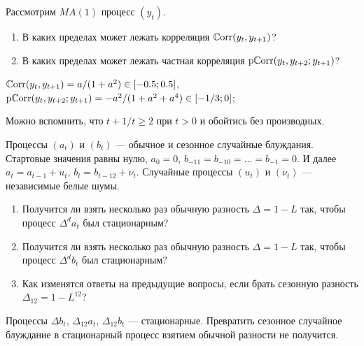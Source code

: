 \begin{problem}
  Рассмотрим $MA(1)$ процесс $(y_t)$. 
  \begin{enumerate}
    \item В каких пределах может лежать корреляция $\operatorname{\mathbb{C}\mathrm{orr}}(y_t, y_{t+1})$?
    \item В каких пределах может лежать частная корреляция $\operatorname{\mathrm{p}\mathbb{C}\mathrm{orr}}(y_t, y_{t+2} ; y_{t+1})$?
  \end{enumerate}
  
  \begin{sol}
    $\operatorname{\mathbb{C}\mathrm{orr}}(y_t, y_{t+1})  = a/(1+a^2) \in [-0.5; 0.5]$, $\operatorname{\mathrm{p}\mathbb{C}\mathrm{orr}}(y_t, y_{t+2} ; y_{t+1}) = -a^2/(1 + a^2 + a^4) \in [-1/3; 0]$;

    Можно вспомнить, что $t + 1/t \geq 2$ при $t >0$ и обойтись без производных.
  \end{sol}
\end{problem}





\begin{problem}
Процессы $(a_t)$ и $(b_t)$ — обычное и сезонное случайные блуждания. 
Стартовые значения равны нулю, $a_0=0$, $b_{-11} = b_{-10} = \ldots = b_{-1} = 0$.
И далее $a_t = a_{t-1} + u_t$, $b_t = b_{t-12} + \nu_t$. 
Случайные процессы $(u_t)$ и $(\nu_t)$ — независимые белые шумы. 

\begin{enumerate}
  \item Получится ли взять несколько раз обычную разность $\Delta = 1 - L$ так, чтобы процесс $\Delta^d a_t$ был стационарным? 
  \item Получится ли взять несколько раз обычную разность $\Delta = 1 - L$ так, чтобы процесс $\Delta^d b_t$ был стационарным? 
  \item Как изменятся ответы на предыдущие вопросы, если брать сезонную разность $\Delta_{12} = 1 - L^{12}$?
\end{enumerate}

  \begin{sol}
    Процессы $\Delta b_t$, $\Delta_{12} a_t$, $\Delta_{12} b_t$ — стационарные. 
    Превратить сезонное случайное блуждание в стационарный процесс взятием обычной разности не получится. 
  \end{sol}
\end{problem}


\begin{problem}


  \begin{sol}
  \end{sol}
\end{problem}


\begin{problem}


  \begin{sol}
  \end{sol}
\end{problem}
